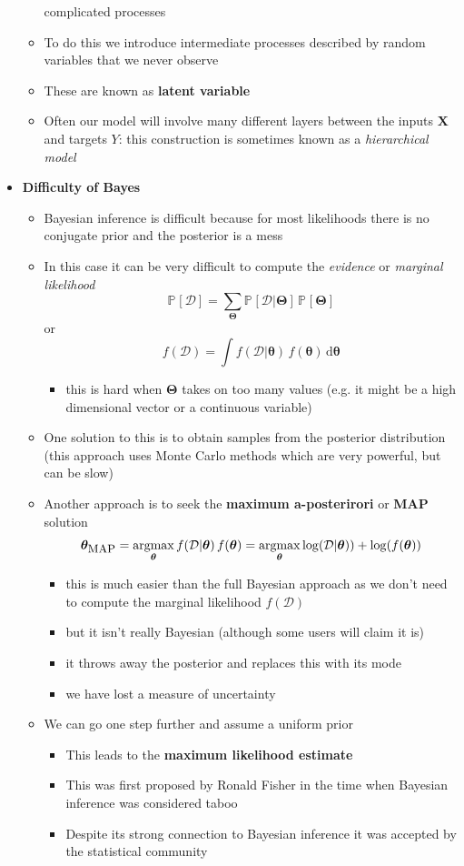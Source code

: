 \documentclass[11pt]{article}
\newcommand{\Prob}[2][]{\mathbb{P}_{#1\!}\left[ #2 \right]}
\newcommand{\logg}[1]{\log\!\left( #1 \right)}
\newcommand{\dd}{\mathrm{d}}
\newcommand{\argmax}{\mathop{\mathrm{argmax}}}
\begin{document}
\begin{itemize}
\begin{itemize}
complicated processes
\item To do this we introduce intermediate processes described by
random variables that we never observe
\item These are known as \textbf{latent variable}
\item Often our model will involve many different layers between the
inputs \(\bm{X}\) and targets \(Y\): this construction is sometimes
known as a \emph{hierarchical  model}
\end{itemize}
\item \textbf{Difficulty of Bayes}
\begin{itemize}
\item Bayesian inference is difficult because for most likelihoods
there is no conjugate prior and the posterior is a mess
\item In this case it can be very difficult to compute the \emph{evidence}
 or \emph{marginal likelihood}
$$ \Prob{\mathcal{D}} = \sum_{\bm{\Theta}} \Prob{\mathcal{D}|\bm{\Theta}} \, \Prob{\bm{\Theta}} $$
or
$$ f(\mathcal{D}) = \int  f(\mathcal{D}|\bm{\theta}) \, f(\bm{\theta})\,\dd \bm{\theta} $$
\begin{itemize}
\item this is hard when \(\bm{\Theta}\) takes on too many values (e.g. it might
be a high dimensional vector or a continuous variable)
\end{itemize}
\item One solution to this is to obtain samples from the
posterior distribution (this approach uses Monte Carlo methods
which are very powerful, but can be slow)
\item Another approach is to seek the \textbf{maximum a-posterirori} or
\textbf{MAP} solution
$$ \bm{\theta}_{\text{\small MAP}} = \argmax_{\bm{\theta}}
       f(\mathcal{D}|\bm{\theta})\, f(\bm{\theta})  =
       \argmax_{\bm{\theta}} \logg{\mathcal{D}|\bm{\theta})} +
       \logg{f(\bm{\theta})} $$
\begin{itemize}
\item this is much easier than the full Bayesian approach as we
don't need to compute the marginal likelihood \(f(\mathcal{D})\)
\item but it isn't really Bayesian (although some users will claim it is)
\item it throws away the posterior and replaces this with its mode
\item we have lost a measure of uncertainty
\end{itemize}
\item We can go one step further and assume a uniform prior
\begin{itemize}
\item This leads to the \textbf{maximum likelihood estimate}
\item This was first proposed by Ronald Fisher in the time when
Bayesian inference was considered taboo
\item Despite its strong connection to Bayesian inference it was
accepted by the statistical community
\end{itemize}
\end{itemize}
\end{itemize}
\end{document}
